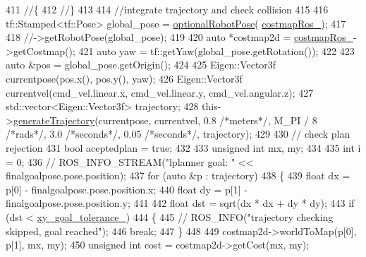 \begin{DoxyCode}
{411     \textcolor{comment}{//\{}
412     \textcolor{comment}{//\}}
413 
414     \textcolor{comment}{//integrate trajectory and check collision}
415 
416     tf::Stamped<tf::Pose> global\_pose = \hyperlink{namespacecl__move__base__z_1_1forward__local__planner_a4c20f9fe0ca67779c53e90182baf4997}{optionalRobotPose}(
      \hyperlink{classcl__move__base__z_1_1forward__local__planner_1_1ForwardLocalPlanner_a37791fea67ce92c6e38e3727311e533b}{costmapRos\_});
417 
418     \textcolor{comment}{//->getRobotPose(global\_pose);}
419 
420     \textcolor{keyword}{auto} *costmap2d = \hyperlink{classcl__move__base__z_1_1forward__local__planner_1_1ForwardLocalPlanner_a37791fea67ce92c6e38e3727311e533b}{costmapRos\_}->getCostmap();
421     \textcolor{keyword}{auto} yaw = tf::getYaw(global\_pose.getRotation());
422 
423     \textcolor{keyword}{auto} &pos = global\_pose.getOrigin();
424 
425     Eigen::Vector3f currentpose(pos.x(), pos.y(), yaw);
426     Eigen::Vector3f currentvel(cmd\_vel.linear.x, cmd\_vel.linear.y, cmd\_vel.angular.z);
427     std::vector<Eigen::Vector3f> trajectory;
428     this->\hyperlink{classcl__move__base__z_1_1forward__local__planner_1_1ForwardLocalPlanner_a3e852f81ccae82c56d7f25e56def899c}{generateTrajectory}(currentpose, currentvel, 0.8 \textcolor{comment}{/*meters*/}, M\_PI / 8 \textcolor{comment}{/*rads*/}, 
      3.0 \textcolor{comment}{/*seconds*/}, 0.05 \textcolor{comment}{/*seconds*/}, trajectory);
429 
430     \textcolor{comment}{// check plan rejection}
431     \textcolor{keywordtype}{bool} aceptedplan = \textcolor{keyword}{true};
432 
433     \textcolor{keywordtype}{unsigned} \textcolor{keywordtype}{int} mx, my;
434 
435     \textcolor{keywordtype}{int} i = 0;
436     \textcolor{comment}{// ROS\_INFO\_STREAM("lplanner goal: " << finalgoalpose.pose.position);}
437     \textcolor{keywordflow}{for} (\textcolor{keyword}{auto} &p : trajectory)
438     \{
439         \textcolor{keywordtype}{float} dx = p[0] - finalgoalpose.pose.position.x;
440         \textcolor{keywordtype}{float} dy = p[1] - finalgoalpose.pose.position.y;
441 
442         \textcolor{keywordtype}{float} dst = sqrt(dx * dx + dy * dy);
443         \textcolor{keywordflow}{if} (dst < \hyperlink{classcl__move__base__z_1_1forward__local__planner_1_1ForwardLocalPlanner_acd2ed91ee166f03faeeb9d6a4b91084b}{xy\_goal\_tolerance\_})
444         \{
445             \textcolor{comment}{//  ROS\_INFO("trajectory checking skipped, goal reached");}
446             \textcolor{keywordflow}{break};
447         \}
448 
449         costmap2d->worldToMap(p[0], p[1], mx, my);
450         \textcolor{keywordtype}{unsigned} \textcolor{keywordtype}{int} cost = costmap2d->getCost(mx, my);
}
\end{DoxyCode}
